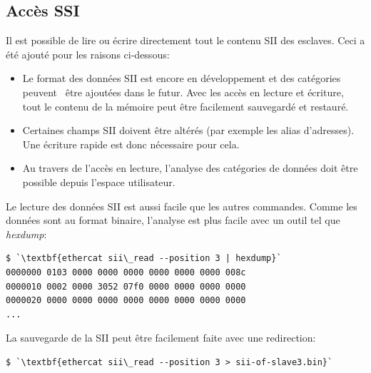 \documentclass[a4paper,12pt,BCOR6mm,bibtotoc,idxtotoc]{scrbook}
\begin{document}



\subsection{Acc\`es SSI}
\label{sec:siiaccess}

Il est possible de lire ou \'ecrire directement tout le contenu SII
des esclaves. Ceci a \'et\'e ajout\'e pour les raisons ci-dessous:

\begin{itemize}

\item Le format des donn\'ees SII est encore en d\'eveloppement et des
  cat\'egories peuvent \ \^etre ajout\'ees dans le futur.  Avec les
  acc\`es en lecture et \'ecriture, tout le contenu de la m\'emoire
  peut \^etre facilement sauvegard\'e et restaur\'e.

\item Certaines champs SII doivent \^etre alt\'er\'es (par exemple les
  alias d'adresses). Une \'ecriture rapide est donc n\'ecessaire pour
  cela.

\item Au travers de l'acc\`es en lecture, l'analyse des cat\'egories
  de donn\'ees doit \^etre possible depuis l'espace utilisateur.

\end{itemize}



Le lecture des donn\'ees SII est aussi facile que les autres commandes.
Comme les donn\'ees sont au format binaire,
l'analyse est plus facile avec un outil tel que \textit{hexdump}:

\begin{lstlisting}
$ `\textbf{ethercat sii\_read --position 3 | hexdump}`
0000000 0103 0000 0000 0000 0000 0000 0000 008c
0000010 0002 0000 3052 07f0 0000 0000 0000 0000
0000020 0000 0000 0000 0000 0000 0000 0000 0000
...
\end{lstlisting}

La sauvegarde de la SII peut \^etre facilement faite avec une redirection:

\begin{lstlisting}
$ `\textbf{ethercat sii\_read --position 3 > sii-of-slave3.bin}`
\end{lstlisting}
\end{document}

